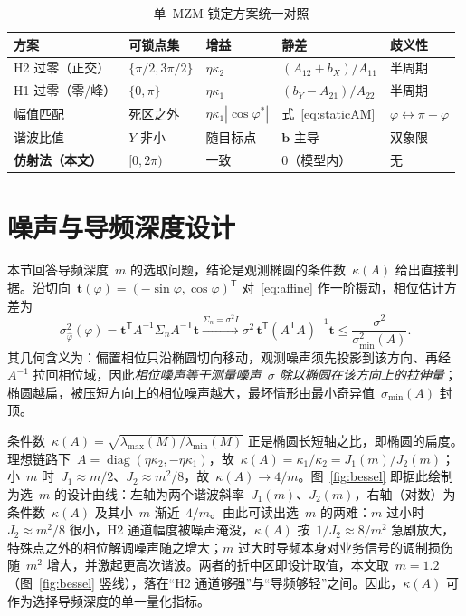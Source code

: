 \documentclass[11pt,journal,onecolumn]{IEEEtran}
\theoremstyle{plain}
\theoremstyle{remark}
\newcommand{\bv}{\mathbf{b}}
\newcommand{\tv}{\mathbf{t}}
\newcommand{\T}{\mathsf{T}}
\begin{document}
\begin{table}[!t]
\caption{单~MZM 锁定方案统一对照}
\label{tab:schemes}
\centering
\footnotesize
\setlength{\tabcolsep}{5pt}
\begin{tabular}{lllll}
\toprule
方案 & 可锁点集 & 增益 & 静差 & 歧义性\\
\midrule
H2 过零（正交） & $\{\pi/2,3\pi/2\}$ & $\eta\kappa_2$ &
$(A_{12}{+}b_X)/A_{11}$ & 半周期\\
H1 过零（零/峰） & $\{0,\pi\}$ & $\eta\kappa_1$ &
$(b_Y{-}A_{21})/A_{22}$ & 半周期\\
幅值匹配 & 死区之外 & $\eta\kappa_1|\cos\varphi^\ast|$ &
式~\eqref{eq:staticAM} & $\varphi\!\leftrightarrow\!\pi{-}\varphi$\\
谐波比值 & $Y$ 非小 & 随目标点 & $\bv$ 主导 & 双象限\\
\textbf{仿射法（本文）} & $[0,2\pi)$ & 一致 & $0$（模型内） & 无\\
\bottomrule
\end{tabular}
\end{table}

\section{噪声与导频深度设计}
\label{sec:noise}
本节回答导频深度~$m$ 的选取问题，结论是观测椭圆的条件数~$\kappa(A)$ 给出直接判据。沿切向~$\tv(\varphi)=(-\sin\varphi,\cos\varphi)^{\T}$ 对~\eqref{eq:affine} 作一阶摄动，相位估计方差为
\begin{equation}
\sigma^2_{\hat\varphi}(\varphi)
=\tv^{\T}A^{-1}\Sigma_nA^{-\T}\tv
\xrightarrow{\Sigma_n=\sigma^2I}\sigma^2\,\tv^{\T}(A^{\T}A)^{-1}\tv
\le\frac{\sigma^2}{\sigma^2_{\min}(A)}.
\label{eq:var}
\end{equation}
其几何含义为：偏置相位只沿椭圆切向移动，观测噪声须先投影到该方向、再经~$A^{-1}$ 拉回相位域，因此\emph{相位噪声等于测量噪声~$\sigma$ 除以椭圆在该方向上的拉伸量}；椭圆越扁，被压短方向上的相位噪声越大，最坏情形由最小奇异值~$\sigma_{\min}(A)$ 封顶。

条件数~$\kappa(A)=\sqrt{\lambda_{\max}(M)/\lambda_{\min}(M)}$ 正是椭圆长短轴之比，即椭圆的扁度。理想链路下~$A=\operatorname{diag}(\eta\kappa_2,-\eta\kappa_1)$，故~$\kappa(A)=\kappa_1/\kappa_2=J_1(m)/J_2(m)$；小~$m$ 时~$J_1\approx m/2$、$J_2\approx m^2/8$，故~$\kappa(A)\to 4/m$。图~\ref{fig:bessel} 即据此绘制为选~$m$ 的设计曲线：左轴为两个谐波斜率~$J_1(m)$、$J_2(m)$，右轴（对数）为条件数~$\kappa(A)$ 及其小~$m$ 渐近~$4/m$。由此可读出选~$m$ 的两难：$m$ 过小时~$J_2\approx m^2/8$ 很小，H2 通道幅度被噪声淹没，$\kappa(A)$ 按~$1/J_2\approx 8/m^2$ 急剧放大，特殊点之外的相位解调噪声随之增大；$m$ 过大时导频本身对业务信号的调制损伤随~$m^2$ 增大，并激起更高次谐波。两者的折中区即设计取值，本文取~$m{=}1.2$（图~\ref{fig:bessel} 竖线），落在“H2 通道够强”与“导频够轻”之间。因此，$\kappa(A)$ 可作为选择导频深度的单一量化指标。
\end{document}

